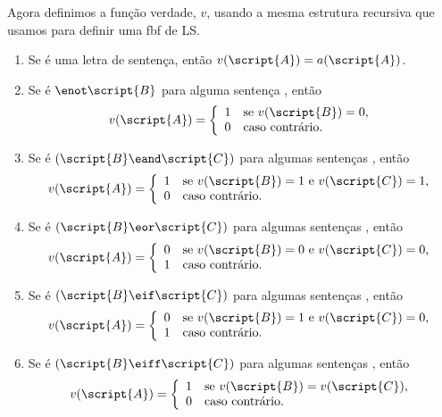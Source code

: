 Agora definimos a função verdade, $v$, usando a mesma estrutura recursiva que usamos para definir uma fbf de LS.

\begin{enumerate}
\item Se  é uma letra de sentença, então $v(\script{A})=a(\script{A})$.

\item Se  é ${\enot}\script{B}$ para alguma sentença , então
\begin{displaymath}v(\script{A}) =
	\left\{\begin{array}{ll}
	1 & \mbox{se $v(\script{B}) = 0$},\\
	0 & \mbox{caso contrário.}
	\end{array}\right.
\end{displaymath}

\item Se  é $(\script{B}\eand\script{C})$ para algumas sentenças , então
\begin{displaymath}v(\script{A}) =
	\left\{\begin{array}{ll}
	1 & \mbox{se $v(\script{B}) = 1$ e $v(\script{C}) = 1$,}\\
	0 & \mbox{caso contrário.}
	\end{array}\right.
\end{displaymath}

\item Se  é $(\script{B}\eor\script{C})$ para algumas sentenças , então
\begin{displaymath}v(\script{A}) =
	\left\{\begin{array}{ll}
	0 & \mbox{se $v(\script{B}) = 0$ e $v(\script{C}) = 0$,}\\
	1 & \mbox{caso contrário.}
	\end{array}\right.
\end{displaymath}

\item Se  é $(\script{B}\eif\script{C})$ para algumas sentenças , então
\begin{displaymath}v(\script{A}) =
	\left\{\begin{array}{ll}
	0 & \mbox{se $v(\script{B}) = 1$ e $v(\script{C}) = 0$,}\\
	1 & \mbox{caso contrário.}
	\end{array}\right.
\end{displaymath}

\item Se  é $(\script{B}\eiff\script{C})$ para algumas sentenças , então
\begin{displaymath}v(\script{A}) =
	\left\{\begin{array}{ll}
	1 & \mbox{se $v(\script{B}) = v(\script{C})$},\\
	0 & \mbox{caso contrário.}
	\end{array}\right.
\end{displaymath}
\end{enumerate}

